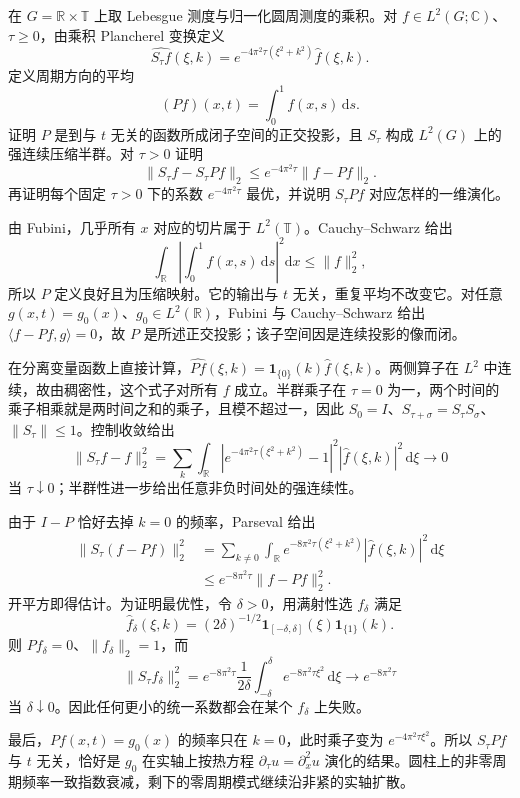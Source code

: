 \begin{exercise}[圆柱上周期振荡的消散]\label{b2:ex:I4-cylinder-heat}
在 \(G=\mathbb R\times\mathbb T\) 上取 Lebesgue 测度与归一化圆周测度的乘积。对 \(f\in L^2(G;\mathbb C)\)、\(\tau\ge0\)，由乘积 Plancherel 变换定义
\[
 \widehat{S_\tau f}(\xi,k)
   =e^{-4\pi^2\tau(\xi^2+k^2)}\widehat f(\xi,k).
\]
定义周期方向的平均
\[
 (Pf)(x,t)=\int_0^1f(x,s)\,\mathrm ds.
\]
证明 \(P\) 是到与 \(t\) 无关的函数所成闭子空间的正交投影，且 \(S_\tau\) 构成 \(L^2(G)\) 上的强连续压缩半群。对 \(\tau>0\) 证明
\[
 \|S_\tau f-S_\tau Pf\|_2
 \le e^{-4\pi^2\tau}\|f-Pf\|_2.
\]
再证明每个固定 \(\tau>0\) 下的系数 \(e^{-4\pi^2\tau}\) 最优，并说明 \(S_\tau Pf\) 对应怎样的一维演化。
\end{exercise}
\begin{solution}
由 Fubini，几乎所有 \(x\) 对应的切片属于 \(L^2(\mathbb T)\)。Cauchy--Schwarz 给出
\[
 \int_{\mathbb R}\left|\int_0^1f(x,s)\,\mathrm ds\right|^2\mathrm dx
 \le\|f\|_2^2,
\]
所以 \(P\) 定义良好且为压缩映射。它的输出与 \(t\) 无关，重复平均不改变它。对任意 \(g(x,t)=g_0(x)\)、\(g_0\in L^2(\mathbb R)\)，Fubini 与 Cauchy--Schwarz 给出 \(\langle f-Pf,g\rangle=0\)，故 \(P\) 是所述正交投影；该子空间因是连续投影的像而闭。

在分离变量函数上直接计算，\(\widehat{Pf}(\xi,k)=\mathbf1_{\{0\}}(k)\widehat f(\xi,k)\)。两侧算子在 \(L^2\) 中连续，故由稠密性，这个式子对所有 \(f\) 成立。半群乘子在 \(\tau=0\) 为一，两个时间的乘子相乘就是两时间之和的乘子，且模不超过一，因此 \(S_0=I\)、\(S_{\tau+\sigma}=S_\tau S_\sigma\)、\(\|S_\tau\|\le1\)。控制收敛给出
\[
 \|S_\tau f-f\|_2^2
 =\sum_k\int_{\mathbb R}
   |e^{-4\pi^2\tau(\xi^2+k^2)}-1|^2
            |\widehat f(\xi,k)|^2\,\mathrm d\xi\longrightarrow0
\]
当 \(\tau\downarrow0\)；半群性进一步给出任意非负时间处的强连续性。

由于 \(I-P\) 恰好去掉 \(k=0\) 的频率，Parseval 给出
\begin{align*}
 \|S_\tau(f-Pf)\|_2^2
 &=\sum_{k\ne0}\int_{\mathbb R}
      e^{-8\pi^2\tau(\xi^2+k^2)}|\widehat f(\xi,k)|^2\,\mathrm d\xi\\
 &\le e^{-8\pi^2\tau}\|f-Pf\|_2^2.
\end{align*}
开平方即得估计。为证明最优性，令 \(\delta>0\)，用满射性选 \(f_\delta\) 满足
\[
 \widehat f_\delta(\xi,k)
  =(2\delta)^{-1/2}\mathbf1_{[-\delta,\delta]}(\xi)
                         \mathbf1_{\{1\}}(k).
\]
则 \(Pf_\delta=0\)、\(\|f_\delta\|_2=1\)，而
\[
 \|S_\tau f_\delta\|_2^2
 =e^{-8\pi^2\tau}\frac1{2\delta}
                \int_{-\delta}^{\delta}e^{-8\pi^2\tau\xi^2}\,\mathrm d\xi
 \longrightarrow e^{-8\pi^2\tau}
\]
当 \(\delta\downarrow0\)。因此任何更小的统一系数都会在某个 \(f_\delta\) 上失败。

最后，\(Pf(x,t)=g_0(x)\) 的频率只在 \(k=0\)，此时乘子变为 \(e^{-4\pi^2\tau\xi^2}\)。所以 \(S_\tau Pf\) 与 \(t\) 无关，恰好是 \(g_0\) 在实轴上按热方程 \(\partial_\tau u=\partial_x^2u\) 演化的结果。圆柱上的非零周期频率一致指数衰减，剩下的零周期模式继续沿非紧的实轴扩散。
\end{solution}
